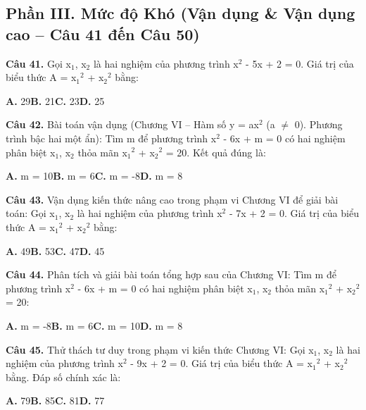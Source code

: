 \documentclass[11pt,a4paper]{article}
\begin{document}
\subsection*{\color{accent} Phần III. Mức độ Khó (Vận dụng \& Vận dụng cao -- Câu 41 đến Câu 50)}
\textbf{\color{primary} Câu 41.} Gọi x$_1$, x$_2$ là hai nghiệm của phương trình x$^2$ - 5x + 2 = 0. Giá trị của biểu thức A = x$_1$$^2$ + x$_2$$^2$ bằng:\par
\hspace*{1.5em}\textbf{A.} 29\quad\quad \textbf{B.} 21\quad\quad \textbf{C.} 23\quad\quad \textbf{D.} 25\par\vspace{2pt}
\textbf{\color{primary} Câu 42.} Bài toán vận dụng (Chương VI – Hàm số y = ax$^2$ (a $\ne$ 0). Phương trình bậc hai một ẩn): Tìm m để phương trình x$^2$ - 6x + m = 0 có hai nghiệm phân biệt x$_1$, x$_2$ thỏa mãn x$_1$$^2$ + x$_2$$^2$ = 20. Kết quả đúng là:\par
\hspace*{1.5em}\textbf{A.} m = 10\quad\quad \textbf{B.} m = 6\quad\quad \textbf{C.} m = -8\quad\quad \textbf{D.} m = 8\par\vspace{2pt}
\textbf{\color{primary} Câu 43.} Vận dụng kiến thức nâng cao trong phạm vi Chương VI để giải bài toán: Gọi x$_1$, x$_2$ là hai nghiệm của phương trình x$^2$ - 7x + 2 = 0. Giá trị của biểu thức A = x$_1$$^2$ + x$_2$$^2$ bằng:\par
\hspace*{1.5em}\textbf{A.} 49\quad\quad \textbf{B.} 53\quad\quad \textbf{C.} 47\quad\quad \textbf{D.} 45\par\vspace{2pt}
\textbf{\color{primary} Câu 44.} Phân tích và giải bài toán tổng hợp sau của Chương VI: Tìm m để phương trình x$^2$ - 6x + m = 0 có hai nghiệm phân biệt x$_1$, x$_2$ thỏa mãn x$_1$$^2$ + x$_2$$^2$ = 20:\par
\hspace*{1.5em}\textbf{A.} m = -8\quad\quad \textbf{B.} m = 6\quad\quad \textbf{C.} m = 10\quad\quad \textbf{D.} m = 8\par\vspace{2pt}
\textbf{\color{primary} Câu 45.} Thử thách tư duy trong phạm vi kiến thức Chương VI: Gọi x$_1$, x$_2$ là hai nghiệm của phương trình x$^2$ - 9x + 2 = 0. Giá trị của biểu thức A = x$_1$$^2$ + x$_2$$^2$ bằng. Đáp số chính xác là:\par
\hspace*{1.5em}\textbf{A.} 79\quad\quad \textbf{B.} 85\quad\quad \textbf{C.} 81\quad\quad \textbf{D.} 77\par\vspace{2pt}
\end{document}
